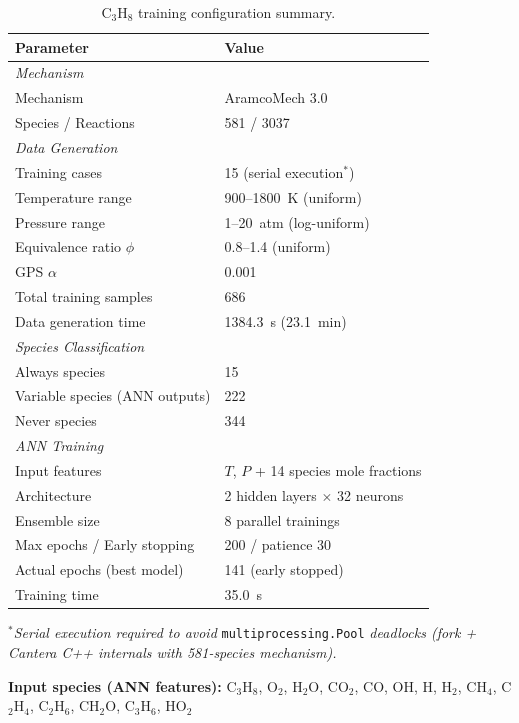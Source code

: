 \documentclass[11pt,a4paper]{article}
\begin{document}
\begin{table}[H]
\centering
\caption{C$_3$H$_8$ training configuration summary.}
\label{tab:c3h8_config}
\begin{tabular}{ll}
\toprule
\textbf{Parameter} & \textbf{Value} \\
\midrule
\multicolumn{2}{l}{\textit{Mechanism}} \\
\quad Mechanism & AramcoMech 3.0 \\
\quad Species / Reactions & 581 / 3037 \\
\midrule
\multicolumn{2}{l}{\textit{Data Generation}} \\
\quad Training cases & 15 (serial execution$^*$) \\
\quad Temperature range & 900--1800~K (uniform) \\
\quad Pressure range & 1--20~atm (log-uniform) \\
\quad Equivalence ratio $\phi$ & 0.8--1.4 (uniform) \\
\quad GPS $\alpha$ & 0.001 \\
\quad Total training samples & 686 \\
\quad Data generation time & 1384.3~s (23.1~min) \\
\midrule
\multicolumn{2}{l}{\textit{Species Classification}} \\
\quad Always species & 15 \\
\quad Variable species (ANN outputs) & 222 \\
\quad Never species & 344 \\
\midrule
\multicolumn{2}{l}{\textit{ANN Training}} \\
\quad Input features & $T$, $P$ + 14 species mole fractions \\
\quad Architecture & 2 hidden layers $\times$ 32 neurons \\
\quad Ensemble size & 8 parallel trainings \\
\quad Max epochs / Early stopping & 200 / patience 30 \\
\quad Actual epochs (best model) & 141 (early stopped) \\
\quad Training time & 35.0~s \\
\bottomrule
\end{tabular}
\end{table}

\noindent$^*$\textit{Serial execution required to avoid} \texttt{multiprocessing.Pool} \textit{deadlocks (fork + Cantera C++ internals with 581-species mechanism).}

\medskip
\textbf{Input species (ANN features):} C$_3$H$_8$, O$_2$, H$_2$O, CO$_2$, CO, OH, H, H$_2$, CH$_4$, C$_2$H$_4$, C$_2$H$_6$, CH$_2$O, C$_3$H$_6$, HO$_2$
\end{document}
